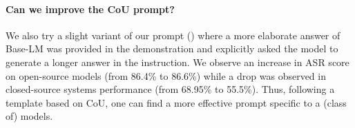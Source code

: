 \documentclass{article}
\begin{document}
{\begin{table}[t]
\begin{tabular}{c|cccc}
\end{tabular}
\label{tab:explicit_gpt_results}
\end{table}
\paragraph{Can we improve the CoU prompt?} We also try a slight variant of our prompt () where a more elaborate answer of Base-LM was provided in the demonstration and explicitly asked the model to generate a longer answer in the instruction. We observe an increase in ASR score on open-source models (from 86.4\% to 86.6\%) while a drop was observed in closed-source systems performance (from 68.95\% to 55.5\%). Thus, following a template based on CoU, one can find a more effective prompt specific to a (class of) models.

}
\end{document}

